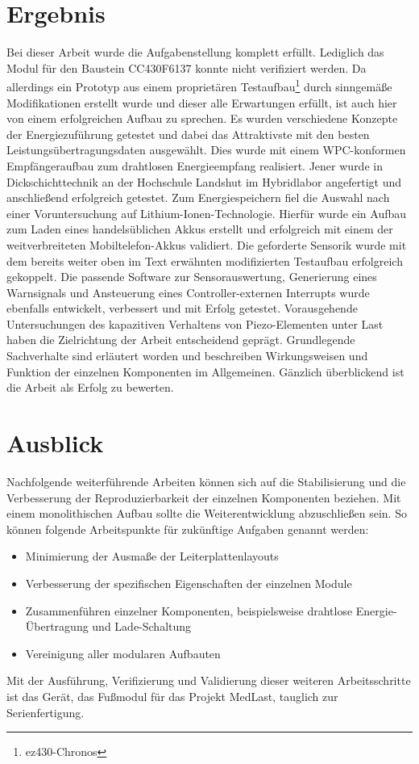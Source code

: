 \documentclass[12pt]{scrreprt} %
\begin{document}
\chapter{Ergebnis}
Bei dieser Arbeit wurde die Aufgabenstellung komplett erfüllt. Lediglich das Modul für den Baustein CC430F6137 konnte nicht verifiziert werden. Da allerdings ein Prototyp aus einem proprietären Testaufbau\footnote{ez430-Chronos} durch sinngemäße Modifikationen erstellt wurde und dieser alle Erwartungen erfüllt, ist auch hier von einem erfolgreichen Aufbau zu sprechen. Es wurden verschiedene Konzepte der Energiezuführung getestet und dabei das Attraktivste mit den besten Leistungsübertragungsdaten ausgewählt. Dies wurde mit einem WPC-konformen Empfängeraufbau zum drahtlosen Energieempfang realisiert. Jener wurde in Dickschichttechnik an der Hochschule Landshut im Hybridlabor angefertigt und anschließend erfolgreich getestet. Zum Energiespeichern fiel die Auswahl nach einer Voruntersuchung auf Lithium-Ionen-Technologie. Hierfür wurde ein Aufbau zum Laden eines handelsüblichen Akkus erstellt und erfolgreich mit einem der weitverbreiteten Mobiltelefon-Akkus validiert. Die geforderte Sensorik wurde mit dem bereits weiter oben im Text erwähnten modifizierten Testaufbau erfolgreich gekoppelt. Die passende Software zur Sensorauswertung, Generierung eines Warnsignals und Ansteuerung eines Controller-externen Interrupts wurde ebenfalls entwickelt, verbessert und mit Erfolg getestet. Vorausgehende Untersuchungen des kapazitiven Verhaltens von Piezo-Elementen unter Last haben die Zielrichtung der Arbeit entscheidend geprägt. Grundlegende Sachverhalte sind erläutert worden und beschreiben Wirkungsweisen und Funktion der einzelnen Komponenten im Allgemeinen. Gänzlich überblickend ist die Arbeit als Erfolg zu bewerten. 
\chapter{Ausblick}
Nachfolgende weiterführende Arbeiten können sich auf die Stabilisierung und die Verbesserung der Reproduzierbarkeit der einzelnen Komponenten beziehen. Mit einem monolithischen Aufbau sollte die Weiterentwicklung abzuschließen sein. So können folgende Arbeitspunkte für zukünftige Aufgaben genannt werden:
\begin{itemize}
\item
Minimierung der Ausmaße der Leiterplattenlayouts
\item
Verbesserung der spezifischen Eigenschaften der einzelnen Module
\item
Zusammenführen einzelner Komponenten, beispielsweise drahtlose Energie-Übertragung und Lade-Schaltung
\item
Vereinigung aller modularen Aufbauten
\end{itemize}
Mit der Ausführung, Verifizierung und Validierung dieser weiteren Arbeitsschritte ist das Gerät, das Fußmodul für das Projekt MedLast, tauglich zur Serienfertigung.


\end{document}
